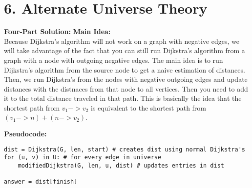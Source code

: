 \documentclass[11pt]{article}
\newenvironment{FourPartSolution}{\par{\bf Four-Part Solution:}}{\smallskip}
\newenvironment{mainIdea}{{\bf Main Idea:}}{\smallskip}
\newenvironment{pseudocode}{\par{\bf Pseudocode:}}{\smallskip}
\begin{document}
\section*{6. Alternate Universe Theory}
\begin{FourPartSolution}
\begin{mainIdea}
\\
Because Dijkstra's algorithm will not work on a graph with negative edges, we will take advantage of the fact that you can still run Dijkstra's algorithm from a graph with a node with outgoing negative edges. The main idea is to run Dijkstra's algorithm from the source node to get a naive estimation of distances. Then, we run Dijkstra's from the nodes with negative outgoing edges and update distances with the distnaces from that node to all vertices. Then you need to add it to the total distance traveled in that path. This is basically the idea that the shortest path from $v_1 -> v_2$ is equivalent to the shortest path from $(v_1 -> n) + (n -> v_2)$.
\end{mainIdea}
\\
\begin{pseudocode}
\begin{lstlisting}
dist = Dijkstra(G, len, start) # creates dist using normal Dijkstra's
for (u, v) in U: # for every edge in universe
	modifiedDijkstra(G, len, u, dist) # updates entries in dist

answer = dist[finish]


\end{lstlisting}
\end{pseudocode}
\end{FourPartSolution}
\end{document}
